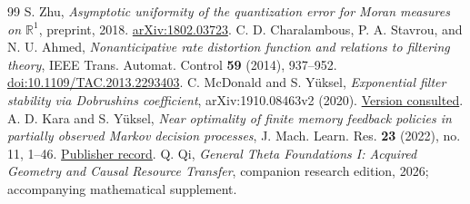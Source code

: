 \begin{thebibliography}{99}
 S. Zhu, \emph{Asymptotic uniformity of the quantization error for Moran measures on $\mathbb R^1$}, preprint, 2018. \href{https://arxiv.org/abs/1802.03723}{arXiv:1802.03723}.
 C. D. Charalambous, P. A. Stavrou, and N. U. Ahmed, \emph{Nonanticipative rate distortion function and relations to filtering theory}, IEEE Trans. Automat. Control \textbf{59} (2014), 937--952. \href{https://doi.org/10.1109/TAC.2013.2293403}{doi:10.1109/TAC.2013.2293403}.
 C. McDonald and S. Y\"uksel, \emph{Exponential filter stability via Dobrushin\textquotesingle s coefficient}, arXiv:1910.08463v2 (2020). \href{https://arxiv.org/abs/1910.08463v2}{Version consulted}.
 A. D. Kara and S. Y\"uksel, \emph{Near optimality of finite memory feedback policies in partially observed Markov decision processes}, J. Mach. Learn. Res. \textbf{23} (2022), no. 11, 1--46. \href{https://jmlr.org/papers/v23/20-1152.html}{Publisher record}.
 Q. Qi, \emph{General Theta Foundations I: Acquired Geometry and Causal Resource Transfer}, companion research edition, 2026; accompanying mathematical supplement.
\end{thebibliography}
